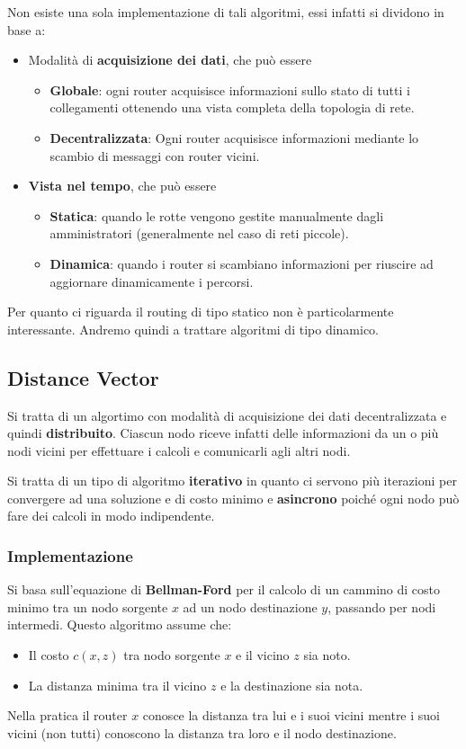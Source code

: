 Non esiste una sola implementazione di tali algoritmi, essi infatti si 
dividono in base a:
\begin{itemize}
	\item Modalità di \textbf{acquisizione dei dati}, che può essere
		\begin{itemize}
			\item \textbf{Globale}: ogni router acquisisce informazioni
				sullo stato di tutti i collegamenti ottenendo una
				vista completa della topologia di rete.
			\item \textbf{Decentralizzata}: Ogni router acquisisce
				informazioni mediante lo scambio di messaggi con 
				router vicini.
		\end{itemize}
	\item \textbf{Vista nel tempo}, che può essere
		\begin{itemize}
			\item \textbf{Statica}: quando le rotte vengono gestite
				manualmente dagli amministratori (generalmente nel caso
				di reti piccole).
			\item \textbf{Dinamica}: quando i router si scambiano 
				informazioni per riuscire ad aggiornare dinamicamente 
				i percorsi.
		\end{itemize}
\end{itemize}
Per quanto ci riguarda il routing di tipo statico non è particolarmente
interessante. Andremo quindi a trattare algoritmi di tipo dinamico.

\subsection{Distance Vector}
Si tratta di un algortimo con modalità di acquisizione dei dati
decentralizzata e quindi \textbf{distribuito}. Ciascun nodo riceve
infatti delle informazioni da un o più nodi vicini per effettuare
i calcoli e comunicarli agli altri nodi.

Si tratta di un tipo di algoritmo \textbf{iterativo} in quanto ci
servono più iterazioni per convergere ad una soluzione e di costo
minimo e \textbf{asincrono} poiché ogni nodo può fare dei calcoli in
modo indipendente.

\subsubsection{Implementazione}
Si basa sull'equazione di \textbf{Bellman-Ford} per il calcolo di un
cammino di costo minimo tra un nodo sorgente $x$ ad un nodo 
destinazione $y$, passando per nodi intermedi. Questo algoritmo assume
che:
\begin{itemize}
	\item Il costo $c(x,z)$ tra nodo sorgente $x$ e il vicino $z$ sia
		noto.
	\item La distanza minima tra il vicino $z$ e la destinazione sia
		nota.
\end{itemize}
Nella pratica il router $x$ conosce la distanza tra lui e i suoi vicini
mentre i suoi vicini (non tutti) conoscono la distanza tra loro e il
nodo destinazione.

